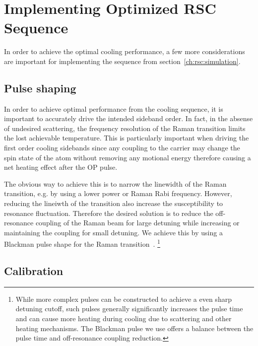 \section{Implementing Optimized RSC Sequence}
\label{ch:rsc:implementation}

In order to achieve the optimal cooling performance, a few more considerations are important
for implementing the sequence from section~\ref{ch:rsc:simulation}.

\subsection{Pulse shaping}
\label{ch:rsc:implementation:pulse-shaping}

In order to achieve optimal performance from the cooling sequence,
it is important to accurately drive the intended sideband order.
In fact, in the absense of undesired scattering,
the frequency resolution of the Raman transition limits the lost achievable temperature.
This is particularly important when driving the first order cooling sidebands
since any coupling to the carrier may change the spin state of the atom without
removing any motional energy therefore causing a net heating effect after the OP pulse.

The obvious way to achieve this is to narrow the linewidth of the Raman transition,
e.g. by using a lower power or Raman Rabi frequency.
However, reducing the lineiwth of the transition also increase the susceptibility
to resonance fluctuation.
Therefore the desired solution is to reduce the off-resonance coupling of the Raman beam
for large detuning while increasing or maintaining the coupling for small detuning.
We achieve this by using a Blackman pulse shape for
the Raman transition~\cite{kasevich_laser_1992}.
\footnote{While more complex pulses can be constructed to achieve a even sharp detuning cutoff,
  \todo{\cite{}} such pulses generally significantly increases the pulse time
  and can cause more heating during cooling due to scattering and other heating mechanisms.
  The Blackman pulse we use offers a balance between the pulse time
  and off-resonance coupling reduction.}

\subsection{Calibration}
\label{ch:rsc:implementation:calibration}

